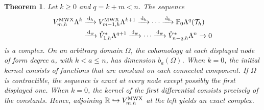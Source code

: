 \documentclass[10pt]{amsart}
\numberwithin{equation}{section}
\newtheorem{theorem}{Theorem}[section]
\newcommand{\dd}{\,{\rm d}}
\begin{document}
\begin{theorem}\label{thm:MWXsplice}
Let $k\geq0$ and $q=k+m<n$. The sequence
\begin{equation}\label{complex:ncfem1}
\begin{aligned}
V_{m,h}^{\rm MWX}\Lambda^{k}
&\xrightarrow{\dd_h}V_{m-1,h}^{\rm MWX}\Lambda^{k+1}
\xrightarrow{\dd_h}\cdots\xrightarrow{\dd_h}
\mathbb P_0\Lambda^{q}(\mathcal T_h)\\
&\xrightarrow{\dd_w}\mathring V_{1,h}^{*}\Lambda^{q+1}
\xrightarrow{\dd_w}\cdots\xrightarrow{\dd_w}
\mathring V_{n-q,h}^{*}\Lambda^n\to0
\end{aligned}
\end{equation}
is a complex. On an arbitrary domain $\Omega$, the cohomology at each
displayed node of form degree $a$, with $k<a\leq n$, has dimension
$b_a(\Omega)$. When $k=0$, the initial kernel consists of functions that
are constant on each connected component.
If $\Omega$ is contractible, the sequence is exact
at every node except possibly the first displayed one.
When $k=0$, the kernel of the first differential
consists precisely of the constants. Hence,
adjoining $\mathbb R\hookrightarrow
V_{m,h}^{\rm MWX}$ at the left yields an exact complex.
\end{theorem}
\end{document}
